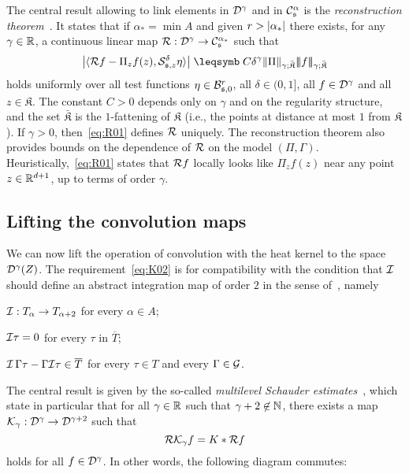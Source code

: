 \documentclass[reqno,11pt]{article}
\def\normDgamma#1{|\!|\!|#1|\!|\!|}
\def\fraks{\mathfrak{s}}
\def\fraK{\mathfrak{K}}
\begin{document}
The central result allowing to link elements in ${\mathcal D}^\gamma$ and in
$\cC^\alpha_\fraks$ is the \emph{reconstruction
theorem}~\cite[Thm~3.10]{Hairer2014}. It states that if $\alpha_*=\min A$ and
given $r>\lvert\alpha_*\rvert$ there exists, for any $\gamma\in\mathbb{R}$, a 
continuous linear map $\cR:\cD^\gamma\to\cC^{\alpha_*}_{\fraks}$ such
that 
\begin{equation}
 \label{eq:R01}
 \bigabs{\pscal{\cR f-\Pi_zf(z)}{\cS^\delta_{\fraks,z}\eta}} 
 \leqs C \delta^\gamma \norm{\Pi}_{\gamma;\bar{\fraK}}
 \normDgamma{f}_{\gamma;\bar{\fraK}}
\end{equation} 
holds uniformly over all test functions $\eta\in\cB^r_{\fraks,0}$, all
$\delta\in(0,1]$, all $f\in{\mathcal D}^\gamma$  and all $z\in\fraK$. The constant $C>0$
depends only on $\gamma$ and on the regularity structure, and the set
$\bar{\fraK}$ is the $1$-fattening of $\fraK$ (i.e., the points at distance at
most $1$ from $\fraK$). If $\gamma>0$, then~\eqref{eq:R01} defines ${\mathcal R}$
uniquely. The reconstruction theorem also provides bounds on the dependence of
${\mathcal R}$ on the model $(\Pi,\Gamma)$. Heuristically,~\eqref{eq:R01} states that
${\mathcal R} f$ locally looks like $\Pi_zf(z)$ near any point $z\in\mathbb{R}^{d+1}$, up to
terms of order $\gamma$. 


\subsection{Lifting the convolution maps}
\label{ssec_convolution}

We can now lift the operation of convolution with the heat kernel to the space
${\mathcal D}^\gamma(Z)$. The requirement~\eqref{eq:K02} is for compatibility with
the condition that ${\mathcal I}$ should define an abstract integration map of order $2$
in the sense of~\cite[Def.~5.7]{Hairer2014}, namely  
\begin{itemizz}
 \item 	${\mathcal I}: T_\alpha \to T_{\alpha+2}$ for every $\alpha\in A$;
 \item 	${\mathcal I}\tau = 0$ for every $\tau$ in $\overline{T}$;
 \item 	${\mathcal I}\,\Gamma\tau - \Gamma{\mathcal I}\tau\in\overline{T}$ for every
$\tau\in T$ and every $\Gamma\in {\mathcal G}$. 
\end{itemizz}

The central result is given by the so-called \emph{multilevel Schauder
estimates}~\cite[Thm~5.12]{Hairer2014}, which state in particular that for all
$\gamma\in\mathbb{R}$ such that $\gamma+2\not\in\mathbb{N}$, there exists a map ${\mathcal K}_\gamma:
{\mathcal D}^\gamma \to {\mathcal D}^{\gamma+2}$ such that 
\begin{equation}
 \label{eq:K_gamma1}
 \cR\cK_\gamma f = K*\cR f
\end{equation} 
holds for all $f\in{\mathcal D}^\gamma$. In other words, the following diagram commutes:
\end{document}
